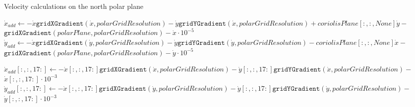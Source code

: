 \begin{algorithm}[htb]
    \caption{Velocity calculations on the north polar plane}
    \label{alg:polar velocity north vectorised}
    $\dot{x}_{add} \leftarrow - \dot{x} \texttt{gridXGradient}(\dot{x}, polarGridResolution) - \dot{y} \texttt{gridYGradient}(\dot{x}, polarGridResolution) + coriolisPlane[:, :, None] \dot{y} -$ 
        $\texttt{gridXGradient}(polarPlane, polarGridResolution) - \dot{x} \cdot 10^{-5}$ \;
    $\dot{y}_{add} \leftarrow - \dot{x} \texttt{gridXGradient}(\dot{y}, polarGridResolution) - \dot{y} \texttt{gridYGradient}(\dot{y}, polarGridResolution) - coriolisPlane[:, :, None] \dot{x} -$ 
        $\texttt{gridXGradient}(polarPlane, polarGridResolution) - \dot{y} \cdot 10^{-5}$ \;

    $\dot{x}_{add}[:,:,17:] \leftarrow - \dot{x}[:,:,17:] \texttt{gridXGradient}(\dot{x}, polarGridResolution) - \dot{y}[:,:,17:] \texttt{gridYGradient}(\dot{x}, polarGridResolution) - $ 
        $\dot{x}[:,:,17:] \cdot 10^{-3}$ \; 
    $\dot{y}_{add}[:,:,17:] \leftarrow - \dot{x}[:,:,17:] \texttt{gridXGradient}(\dot{y}, polarGridResolution) - \dot{y}[:,:,17:] \texttt{gridYGradient}(\dot{y}, polarGridResolution) -$
        $\dot{y}[:,:,17:] \cdot 10^{-3}$ \; 


\end{algorithm}

